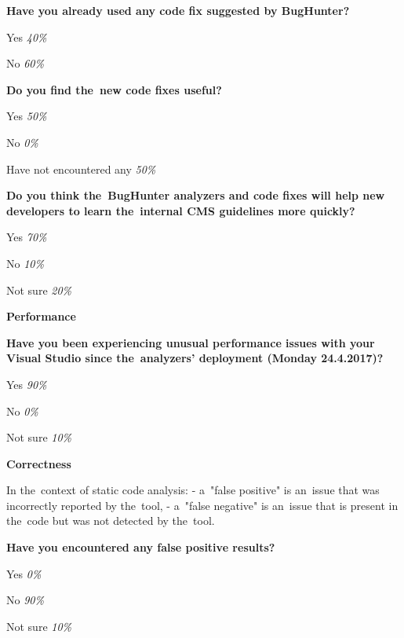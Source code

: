 \documentclass[
  digital, %
  table,   %
  lof,     %
  lot,     %
  oneside,
]{fithesis3}
\begin{document}
\smallskip\noindent
\textbf{Have you already used any code fix suggested by BugHunter?}
\begin{compactitem}
\item Yes \textit{40\%}
\item No \textit{60\%}
\end{compactitem}

\smallskip\noindent
\textbf{Do you find the~new code fixes useful?}
\begin{compactitem}
\item Yes \textit{50\%}
\item No \textit{0\%}
\item Have not encountered any \textit{50\%}
\end{compactitem}

\smallskip\noindent
\textbf{Do you think the~BugHunter analyzers and code fixes will help new developers to learn the~internal CMS guidelines more quickly?}
\begin{compactitem}
\item Yes \textit{70\%}
\item No \textit{10\%}
\item Not sure \textit{20\%}
\end{compactitem}

\begin{center}
\textbf{Performance}
\end{center}

\smallskip\noindent
\textbf{Have you been experiencing unusual performance issues with your Visual Studio since the~analyzers' deployment (Monday 24.4.2017)?}
\begin{compactitem}
\item Yes \textit{90\%}
\item No \textit{0\%}
\item Not sure \textit{10\%}
\end{compactitem}

\begin{center}
\textbf{Correctness}
\end{center}

In the~context of static code analysis:
- a~"false positive" is an~issue that was incorrectly reported by the~tool,
- a~"false negative" is an~issue that is present in the~code but was not detected by the~tool.

\smallskip\noindent
\textbf{Have you encountered any false positive results?}
\begin{compactitem}
\item Yes \textit{0\%}
\item No \textit{90\%}
\item Not sure \textit{10\%}
\end{compactitem}
\end{document}
